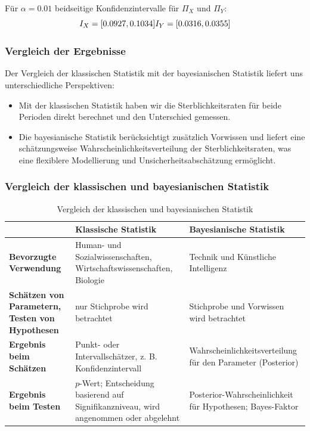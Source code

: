 \documentclass[a4paper,12pt]{article}
\begin{document}
Für $\alpha = 0.01$ beidseitige Konfidenzintervalle für $\Pi_X$ und $\Pi_Y$:
\begin{equation}
  I_X = [0.0927, 0.1034] \\
  I_Y = [0.0316, 0.0355]
\end{equation}

\subsubsection{Vergleich der Ergebnisse}
Der Vergleich der klassischen Statistik mit der bayesianischen Statistik liefert uns unterschiedliche Perspektiven:

\begin{itemize}
    \item Mit der klassischen Statistik haben wir die Sterblichkeitsraten für beide Perioden direkt berechnet und den Unterschied gemessen.
    \item Die bayesianische Statistik berücksichtigt zusätzlich Vorwissen und liefert eine schätzungsweise Wahrscheinlichkeitsverteilung 
    der Sterblichkeitsraten, was eine flexiblere Modellierung und Unsicherheitsabschätzung ermöglicht.
\end{itemize}
\newpage

\subsubsection{Vergleich der klassischen und bayesianischen Statistik}

\begin{table}[h!]
  \centering
  \begin{tabular}{|p{3cm}|p{5cm}|p{6cm}|}
    \hline
    \textbf{} & \textbf{Klassische Statistik} & \textbf{Bayesianische Statistik} \\ \hline
    \textbf{Bevorzugte Verwendung} & Human- und Sozialwissenschaften, Wirtschaftswissenschaften, Biologie & Technik und Künstliche Intelligenz \\ 
    \hline
    \textbf{Schätzen von Parametern, Testen von Hypothesen} & nur Stichprobe wird betrachtet & Stichprobe und Vorwissen wird betrachtet \\
    \hline
    \textbf{Ergebnis beim Schätzen} & Punkt- oder Intervallschätzer, z. B. Konfidenzintervall & Wahrscheinlichkeitsverteilung für den Parameter (Posterior) 
    \\ \hline
  \textbf{Ergebnis beim Testen} & \(p\)-Wert; Entscheidung basierend auf Signifikanzniveau, wird angenommen oder abgelehnt & Posterior-Wahrscheinlichkeit für Hypothesen; Bayes-Faktor \\ 
  \hline
  \end{tabular}
  \caption{Vergleich der klassischen und bayesianischen Statistik}
  \label{tab:vergleich_verwendung}
\end{table}
\end{document}
